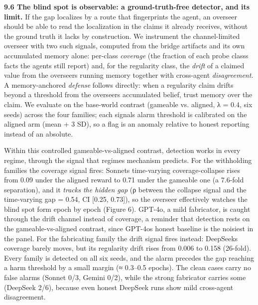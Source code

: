\documentclass[11pt]{article}
\begin{document}
\textbf{9.6 The blind spot is observable: a ground-truth-free detector,
and its limit.} If the gap localizes by a route that fingerprints the
agent, an overseer should be able to read the localization in the claims
it already receives, without the ground truth it lacks by construction.
We instrument the channel-limited overseer with two such signals,
computed from the bridge artifacts and its own accumulated memory alone:
per-class \emph{coverage} (the fraction of each probe
class\textquotesingle s facts the agents still report) and, for the
regularity class, the \emph{drift} of a claimed value from the
overseer\textquotesingle s running memory together with cross-agent
\emph{disagreement}. A memory-anchored \emph{defense} follows directly:
when a regularity claim drifts beyond a threshold from the
overseer\textquotesingle s accumulated belief, trust memory over the
claim. We evaluate on the base-world contrast (gameable vs. aligned, λ =
0.4, six seeds) across the four families; each signal\textquotesingle s
alarm threshold is calibrated on the aligned arm (mean + 3 SD), so a
flag is an anomaly relative to honest reporting instead of an absolute.

Within this controlled gameable-vs-aligned contrast, detection works in
every regime, through the signal that regime\textquotesingle s mechanism
predicts. For the withholding families the coverage signal fires:
Sonnet\textquotesingle s time-varying coverage-collapse rises from 0.09
under the aligned reward to 0.71 under the gameable one (a 7.6-fold
separation), and it \emph{tracks the hidden gap} (ρ between the collapse
signal and the time-varying gap = 0.54, CI {[}0.25, 0.73{]}), so the
overseer effectively watches the blind spot form epoch by epoch (Figure
6). GPT-4o, a mild fabricator, is caught through the drift channel
instead of coverage, a reminder that detection rests on the
gameable-vs-aligned contrast, since GPT-4o\textquotesingle s honest
baseline is the noisiest in the panel. For the fabricating family the
drift signal fires instead: DeepSeek\textquotesingle s coverage barely
moves, but its regularity drift rises from 0.006 to 0.158 (26-fold).
Every family is detected on all six seeds, and the alarm precedes the
gap reaching a harm threshold by a small margin (≈ 0.3--0.5 epochs). The
clean cases carry no false alarms (Sonnet 0/3, Gemini 0/2), while the
strong fabricator carries some (DeepSeek 2/6), because even honest
DeepSeek runs show mild cross-agent disagreement.
\end{document}
